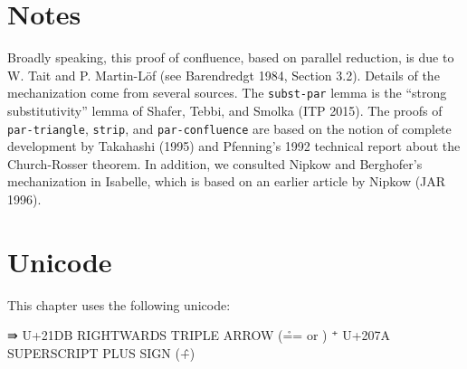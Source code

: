 \hypertarget{notes}{%
\section{Notes}\label{notes}}

Broadly speaking, this proof of confluence, based on parallel reduction,
is due to W. Tait and P. Martin-Löf (see Barendredgt 1984, Section 3.2).
Details of the mechanization come from several sources. The
\texttt{subst-par} lemma is the ``strong substitutivity'' lemma of
Shafer, Tebbi, and Smolka (ITP 2015). The proofs of
\texttt{par-triangle}, \texttt{strip}, and \texttt{par-confluence} are
based on the notion of complete development by Takahashi (1995) and
Pfenning's 1992 technical report about the Church-Rosser theorem. In
addition, we consulted Nipkow and Berghofer's mechanization in Isabelle,
which is based on an earlier article by Nipkow (JAR 1996).

\hypertarget{unicode}{%
\section{Unicode}\label{unicode}}

This chapter uses the following unicode:

\begin{myDisplay}
⇛  U+21DB  RIGHTWARDS TRIPLE ARROW (\r== or \Rrightarrow)
⁺  U+207A  SUPERSCRIPT PLUS SIGN   (\^+)
\end{myDisplay}

